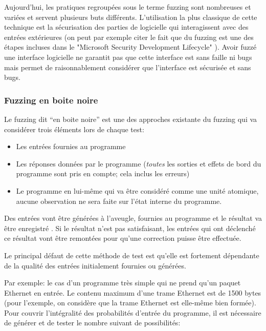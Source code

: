 \documentclass[a4paper]{report}
\begin{document}
Aujourd’hui, les pratiques regroupées sous le terme fuzzing sont nombreuses et variées et servent plusieurs buts différents.
L'utilisation la plus classique  de cette technique est la sécurisation des parties de logicielle qui interagissent avec des entrées extérieures \cite{Godefroid2020} (on peut par exemple citer le fait que du fuzzing est une des étapes incluses dans le "Microsoft Security Development Lifecycle" \cite{howard2006security} ).
Avoir fuzzé une interface logicielle ne garantit pas que cette interface est sans faille ni bugs mais permet de raisonnablement considérer que l'interface est sécurisée et sans bugs\cite{Godefroid2020}.



\subsubsection{Fuzzing en boite noire}

Le fuzzing dit “en boite noire” est une des approches existante du fuzzing qui va considérer trois éléments lors de chaque test:
\begin{itemize}
\item Les entrées fournies au programme
\item Les réponses données par le programme (\textit{toutes} les sorties et effets de bord du programme sont pris en compte; cela inclus les erreurs)
\item Le programme en lui-même qui va être considéré comme une unité atomique, aucune observation ne sera faite sur l'état interne du programme.
\end{itemize}
Des entrées vont être générées à l'aveugle, fournies au programme et le résultat va être enregistré \cite{Forrester2000}.
Si le résultat n'est pas satisfaisant, les entrées qui ont déclenché ce résultat vont être remontées pour qu'une correction puisse être effectuée.

Le principal  défaut de cette méthode de test est qu'elle est fortement dépendante de la qualité des entrées initialement fournies ou générées. 

Par exemple: le cas d'un programme très simple qui ne prend qu'un paquet Ethernet en entrée.
Le contenu maximum d'une trame Ethernet est de 1500 bytes (pour l'exemple, on considère que la trame Ethernet est elle-même bien formée).
Pour couvrir l'intégralité des probabilités d'entrée du programme, il est nécessaire de générer et de tester le nombre suivant de possibilités:
\end{document}
